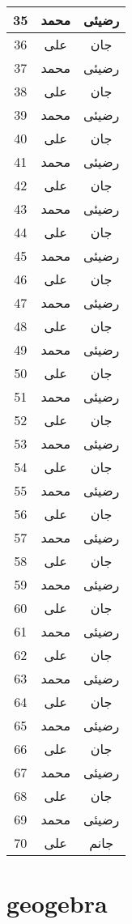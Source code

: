 \documentclass[12pt]{book}
\begin{document}
\begin{center}
\begin{longtable}{ | c | c | c | }
	35 & محمد  & رضیئی \\ \hline
	36 & علی & جان \\ \hline
	37 & محمد  & رضیئی \\ \hline
	38 & علی & جان \\ \hline
	39 & محمد  & رضیئی \\ \hline
	40 & علی & جان \\ \hline
	41 & محمد  & رضیئی \\ \hline
	42 & علی & جان \\ \hline
	43 & محمد  & رضیئی \\ \hline
	44 & علی & جان \\ \hline
	45 & محمد  & رضیئی \\ \hline
	46 & علی & جان \\ \hline
	47 & محمد  & رضیئی \\ \hline
	48 & علی & جان \\ \hline
	49 & محمد  & رضیئی \\ \hline
	50 & علی & جان \\ \hline
	51 & محمد  & رضیئی \\ \hline
	52 & علی & جان \\ \hline
	53 & محمد  & رضیئی \\ \hline
	54 & علی & جان \\ \hline
	55 & محمد  & رضیئی \\ \hline
	56 & علی & جان \\ \hline
	57 & محمد  & رضیئی \\ \hline
	58 & علی & جان \\ \hline
	59 & محمد  & رضیئی \\ \hline
	60 & علی & جان \\ \hline
	61 & محمد  & رضیئی \\ \hline
	62 & علی & جان \\ \hline
	63 & محمد  & رضیئی \\ \hline
	64 & علی & جان \\ \hline
	65 & محمد  & رضیئی \\ \hline
	66 & علی & جان \\ \hline
	67 & محمد  & رضیئی \\ \hline
	68 & علی & جان \\ \hline
	69 & محمد  & رضیئی \\ \hline
	70 & علی & جانم \\ \hline
\end{longtable}
\end{center}
\chapter{geogebra}
 
\end{document}
